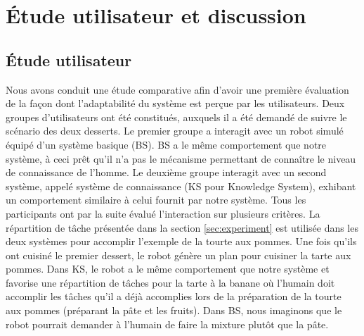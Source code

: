 \documentclass[a4paper,11pt,twoside]{StyleThese}
\begin{document}
\clearpage



 




\section{Étude utilisateur et discussion}
\label{study}

\subsection{Étude utilisateur}
Nous avons conduit une étude comparative afin d'avoir une première évaluation de la façon dont l'adaptabilité du système est perçue par les utilisateurs. Deux groupes d'utilisateurs ont été constitués, auxquels il a été demandé de suivre le scénario des deux desserts. Le premier groupe a interagit avec un robot simulé équipé d'un système basique (BS). BS a le même comportement que notre système, à ceci prêt qu'il n'a pas le mécanisme permettant de connaître le niveau de connaissance de l'homme. Le deuxième groupe interagit avec un second système, appelé système de connaissance (KS pour Knowledge System), exhibant un comportement similaire à celui fournit par notre système.
Tous les participants ont par la suite évalué l'interaction sur plusieurs critères.
%
La répartition de tâche présentée dans la section \ref{sec:experiment} 
est utilisée dans les deux systèmes pour accomplir l'exemple de la tourte aux pommes. Une fois qu'ils ont cuisiné le premier dessert, le robot génère un plan pour cuisiner la tarte aux pommes. Dans KS, le robot a le même comportement que notre système et favorise une répartition de tâches pour la tarte à la banane où l'humain doit accomplir les tâches qu'il a déjà accomplies lors de la préparation de la tourte aux pommes (préparant la pâte et les fruits).
Dans BS, nous imaginons que le robot pourrait demander à l'humain de faire la mixture plutôt que la pâte.
\end{document}
